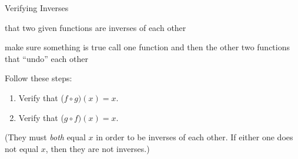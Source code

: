 \documentclass[fleqn,letterpaper,12pt,printwatermark=false]{memoir}
\begin{document}

\pagestyle{myPagestyle}

\checkandfixthelayout
{}
\begin{myNotesHeader}{Verifying Inverses}
    \item {} that two given functions are inverses of each other
\end{myNotesHeader}

\begin{myVocabulary}
        {
            make sure something is true
        }
        {
            call one function and then the other
        }
        {
            two functions that ``undo'' each other
        }
\end{myVocabulary}

\vspace{1em}

\begin{myKeyConcepts}
    Follow these steps:
    \begin{enumerate}
        \item Verify that ($f \circ g)(x) = x$.
        \item Verify that ($g \circ f)(x) = x$.
    \end{enumerate}
    (They must \emph{both} equal $x$ in order to be inverses of each other.
    If either one does not equal $x$, then they are not inverses.)
\end{myKeyConcepts}



  
\end{document}
